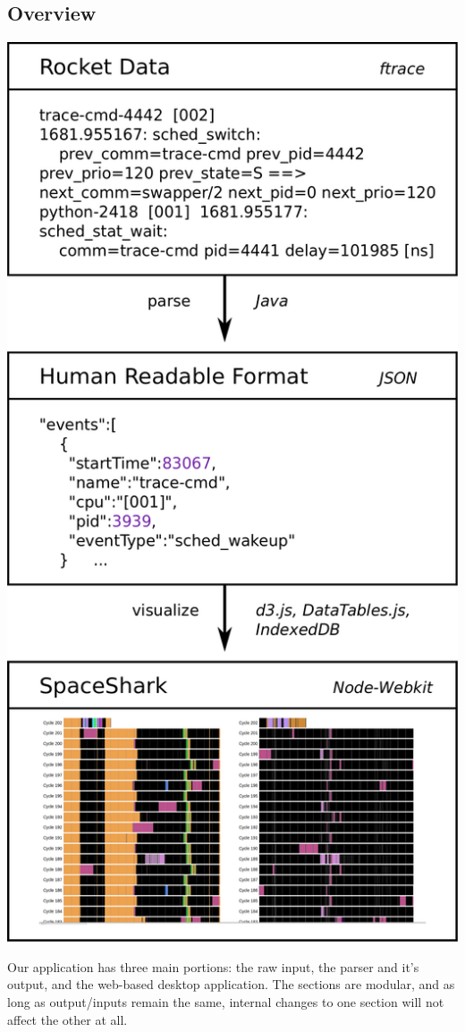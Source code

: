 \documentclass{hmcclinic}
\begin{document}
  \subsection{Overview}
\begin{center}
  \includegraphics[scale=0.18]{architecture_diagram.png}
\end{center}
  Our application has three main portions: the raw input, the parser and it's
  output, and the web-based desktop application. The sections are modular, and
  as long as output/inputs remain the same, internal changes to one section will
  not affect the other at all.
\end{document}
